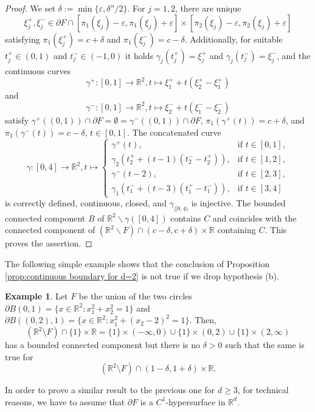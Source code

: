 \documentclass[10pt,leqno]{amsart}
\theoremstyle{definition}
\newtheorem{example}[prop]{Example}
\newcommand{\R}{\mathbb R}
\begin{document}
\begin{proof}
	We set $\delta:=\min\{\varepsilon,\delta''/2\}$. For $j=1,2$, there are unique $$\xi_j^+,\xi_j^-\in \partial F\cap [\pi_1(\xi_j)-\varepsilon,\pi_1(\xi_j)+\varepsilon]\times[\pi_2(\xi_j)-\varepsilon,\pi_2(\xi_j)+\varepsilon]$$
	satisfying $\pi_1(\xi_j^+)=c+\delta$ and $\pi_1(\xi_j^-)=c-\delta$. Additionally, for suitable $t_j^+\in(0,1)$ and $t_j^-\in (-1,0)$ it holds $\gamma_j(t_j^+)=\xi_j^+$ and $\gamma_j(t_j^-)=\xi_j^-$, and the continuous curves
	$$\gamma^+:[0,1]\rightarrow\R^2, t\mapsto \xi_1^+ + t(\xi_2^+-\xi_1^+)$$
	and
	$$\gamma^-:[0,1]\rightarrow\R^2, t\mapsto \xi_2^- + t(\xi_1^- -\xi_2^-)$$
	satisfy $\gamma^+((0,1))\cap\partial F=\emptyset=\gamma^-((0,1))\cap\partial F$, $\pi_1(\gamma^+(t))=c+\delta$, and $\pi_1(\gamma^-(t))=c-\delta$, $t\in [0,1]$. The concatenated curve
	$$\gamma:[0,4]\rightarrow\R^2,t\mapsto\begin{cases}
		\gamma^+(t),&\text{if }t\in [0,1],\\
		\gamma_2(t_2^+ +(t-1)(t_2^--t_2^+)),&\text{if }t\in[1,2],\\
		\gamma^-(t-2),&\text{if }t\in[2,3],\\
		\gamma_1(t_1^-+(t-3)(t_1^+-t_1^-)),&\text{if }t\in[3,4]
	\end{cases}$$
	is correctly defined, continuous, closed, and $\gamma_{|[0,4)}$ is injective. The bounded connected component $B$ of $\R^2\backslash\gamma([0,4])$ contains $C$ and coincides with the connected component of $(\R^2\backslash F)\cap (c-\delta,c+\delta)\times \R$ containing $C$. This proves the assertion.
\end{proof}

The following simple example shows that the conclusion of Proposition \ref{prop:continuous boundary for d=2} is not true if we drop hypothesis (b).

\begin{example}
	Let $F$ be the union of the two circles $\partial B(0,1)=\{x\in \R^2: x_1^2+x_2^2=1\}$ and $\partial B((0,2),1)=\{x\in \R^2: x_1^2+(x_2-2)^2=1\}$. Then,
	$$(\R^2\setminus F)\cap\{1\}\times\R=\{1\}\times (-\infty,0)\cup \{1\}\times (0,2)\cup \{1\}\times (2,\infty)$$
	has a bounded connected component but there is no $\delta>0$ such that the same is true for
	$$(\R^2\setminus F)\cap(1-\delta,1+\delta)\times\R.$$
\end{example}

In order to prove a similar result to the previous one for $d\geq 3$, for technical reasons, we have to assume that $\partial F$ is a $C^1$-hypersurface in $\R^d$.
\end{document}
